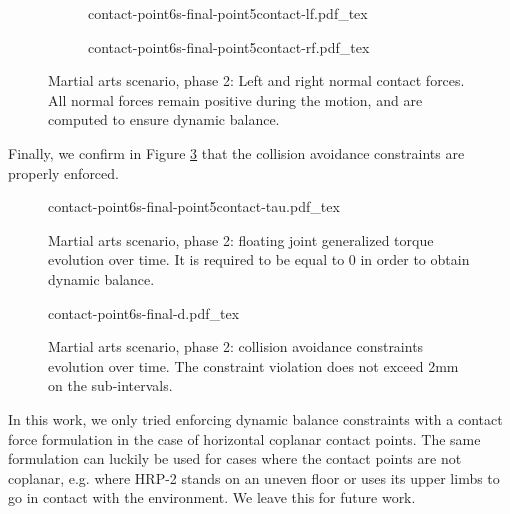 \begin{figure}
  \centering
  \begin{subfigure}{0.49\linewidth}
    \centering
        {\def\svgwidth{\linewidth}
          {\tiny
            
                       {contact-point6s-final-point5contact-lf.pdf_tex}
          }
        }
  \end{subfigure}
  \begin{subfigure}{0.49\linewidth}
    \centering
        {\def\svgwidth{\linewidth}
          {\tiny
            
                       {contact-point6s-final-point5contact-rf.pdf_tex}
          }
        }
  \end{subfigure}
  \caption{Martial arts scenario, phase 2: Left and right normal
    contact forces. All normal forces remain positive during the
    motion, and are computed to ensure dynamic balance.}
  \label{fig:chap3-contact-point6s-final-f}
\end{figure}

Finally, we confirm in Figure \ref{fig:chap3-contact-point6s-final-d}
that the collision avoidance constraints are properly enforced.

\begin{figure}
  \centering
      {\def\svgwidth{0.8\linewidth}
        {\scriptsize
          
                     {contact-point6s-final-point5contact-tau.pdf_tex}
        }
      }
  \caption{Martial arts scenario, phase 2: floating joint generalized
    torque evolution over time. It is required to be equal to 0 in
    order to obtain dynamic balance.}
  \label{fig:chap3-contact-point6s-final-tau}
\end{figure}

\begin{figure}
  \centering
      {\def\svgwidth{0.8\linewidth}
        {\scriptsize
          
                     {contact-point6s-final-d.pdf_tex}
        }
      }
  \caption{Martial arts scenario, phase 2: collision avoidance
    constraints evolution over time. The constraint violation does not
    exceed 2mm on the sub-intervals.}
  \label{fig:chap3-contact-point6s-final-d}
\end{figure}

In this work, we only tried enforcing dynamic balance constraints with
a contact force formulation in the case of horizontal coplanar contact
points. The same formulation can luckily be used for cases where the
contact points are not coplanar, e.g. where HRP-2 stands on an uneven
floor or uses its upper limbs to go in contact with the
environment. We leave this for future work.

